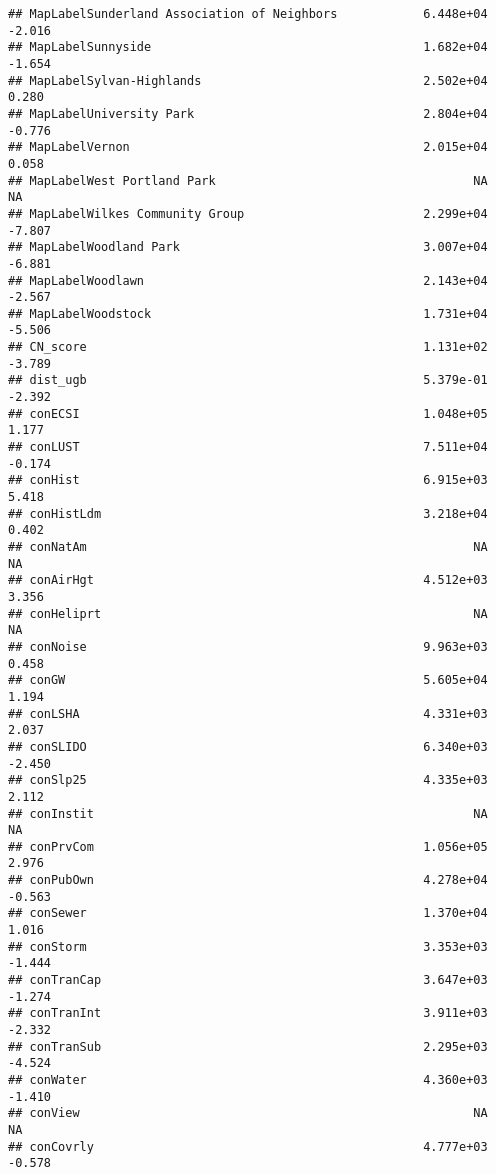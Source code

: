 \documentclass[]{article}
\begin{document}
\begin{verbatim}
## MapLabelSunderland Association of Neighbors            6.448e+04  -2.016
## MapLabelSunnyside                                      1.682e+04  -1.654
## MapLabelSylvan-Highlands                               2.502e+04   0.280
## MapLabelUniversity Park                                2.804e+04  -0.776
## MapLabelVernon                                         2.015e+04   0.058
## MapLabelWest Portland Park                                    NA      NA
## MapLabelWilkes Community Group                         2.299e+04  -7.807
## MapLabelWoodland Park                                  3.007e+04  -6.881
## MapLabelWoodlawn                                       2.143e+04  -2.567
## MapLabelWoodstock                                      1.731e+04  -5.506
## CN_score                                               1.131e+02  -3.789
## dist_ugb                                               5.379e-01  -2.392
## conECSI                                                1.048e+05   1.177
## conLUST                                                7.511e+04  -0.174
## conHist                                                6.915e+03   5.418
## conHistLdm                                             3.218e+04   0.402
## conNatAm                                                      NA      NA
## conAirHgt                                              4.512e+03   3.356
## conHeliprt                                                    NA      NA
## conNoise                                               9.963e+03   0.458
## conGW                                                  5.605e+04   1.194
## conLSHA                                                4.331e+03   2.037
## conSLIDO                                               6.340e+03  -2.450
## conSlp25                                               4.335e+03   2.112
## conInstit                                                     NA      NA
## conPrvCom                                              1.056e+05   2.976
## conPubOwn                                              4.278e+04  -0.563
## conSewer                                               1.370e+04   1.016
## conStorm                                               3.353e+03  -1.444
## conTranCap                                             3.647e+03  -1.274
## conTranInt                                             3.911e+03  -2.332
## conTranSub                                             2.295e+03  -4.524
## conWater                                               4.360e+03  -1.410
## conView                                                       NA      NA
## conCovrly                                              4.777e+03  -0.578

\end{verbatim}
\end{document}
